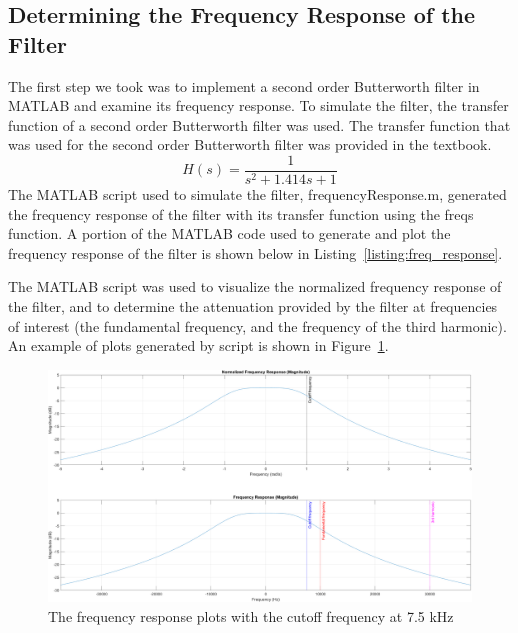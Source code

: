 \documentclass[12pt]{article}
\begin{document}
\subsection*{Determining the Frequency Response of the Filter}
The first step we took was to implement a second order Butterworth filter in MATLAB and examine its frequency response. To simulate the filter, the transfer function of a second order Butterworth filter was used. The transfer function that was used for the second order Butterworth filter was provided in the textbook.
\begin{equation*}
    H(s) = \frac{1}{s^2 + 1.414s + 1}
\end{equation*}
The MATLAB script used to simulate the filter, frequencyResponse.m, generated the frequency response of the filter with its transfer function using the freqs function. A portion of the MATLAB code used to generate and plot the frequency response of the filter is shown below in Listing~\ref{listing:freq_response}.

The MATLAB script was used to visualize the normalized frequency response of the filter, and to determine the attenuation provided by the filter at frequencies of interest (the fundamental frequency, and the frequency of the third harmonic). An example of plots generated by script is shown in Figure~\ref{fig:example_freq_response}.
\begin{figure}[h!]
    \includegraphics[width=\textwidth]{example_frequency_response.png}
    \caption{\label{fig:example_freq_response} The frequency response plots with the cutoff frequency at 7.5 kHz}
\end{figure}
\end{document}

